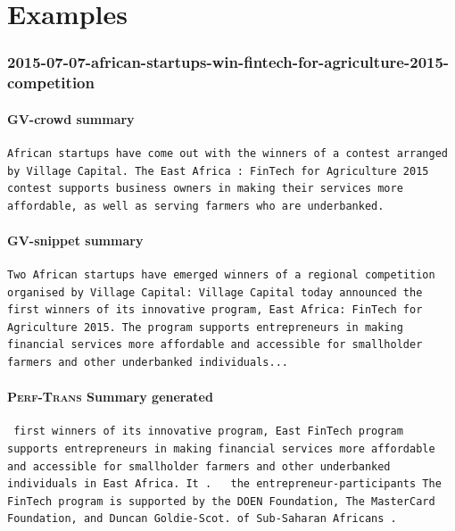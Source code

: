 \documentclass[12pt,a4paper,twoside,openright]{report}
\begin{document}
\phantom{.}



\appendix

\chapter{Examples}

\subsection*{2015-07-07-african-startups-win-fintech-for-agriculture-2015-competition}
\subsubsection{GV-crowd summary}
\begin{lstlisting}
African startups have come out with the winners of a contest arranged by Village Capital. The East Africa : FinTech for Agriculture 2015 contest supports business owners in making their services more affordable, as well as serving farmers who are underbanked.
\end{lstlisting}
\subsubsection{GV-snippet summary}
\begin{lstlisting}
Two African startups have emerged winners of a regional competition organised by Village Capital: Village Capital today announced the first winners of its innovative program, East Africa: FinTech for Agriculture 2015. The program supports entrepreneurs in making financial services more affordable and accessible for smallholder farmers and other underbanked individuals...
\end{lstlisting}
\subsubsection{\textsc{Perf-Trans} Summary generated}
\begin{lstlisting}
 first winners of its innovative program, East FinTech program supports entrepreneurs in making financial services more affordable and accessible for smallholder farmers and other underbanked individuals in East Africa. It .   the entrepreneur-participants The FinTech program is supported by the DOEN Foundation, The MasterCard Foundation, and Duncan Goldie-Scot. of Sub-Saharan Africans .

\end{lstlisting}
\end{document}
